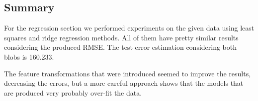 \subsection{Summary}
For the regression section we performed experiments on the given data using least squares and ridge regression methods. All of them have pretty similar results considering the produced RMSE. The test error estimation considering both blobs is 160.233.

The feature transformations that were introduced seemed to improve the results, decreasing the errors, but a more careful approach shows that the models that are produced very probably over-fit the data.